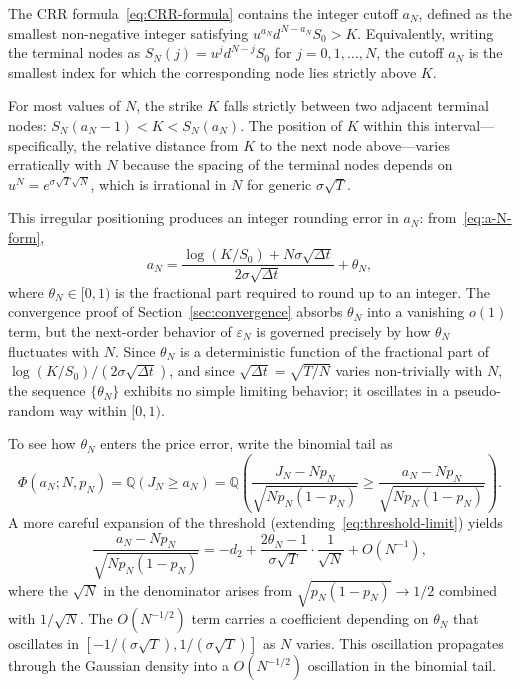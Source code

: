 \documentclass[11pt,a4paper]{article}
\theoremstyle{plain}
\theoremstyle{definition}
\newcommand{\Q}{\mathbb{Q}}
\begin{document}
The CRR formula~\eqref{eq:CRR-formula} contains the integer cutoff
$a_N$, defined as the smallest non-negative integer satisfying
$u^{a_N} d^{N - a_N} S_0 > K$. Equivalently, writing the terminal nodes
as $S_N(j) = u^j d^{N-j} S_0$ for $j = 0, 1, \dots, N$, the cutoff $a_N$
is the smallest index for which the corresponding node lies strictly
above $K$.

For most values of $N$, the strike $K$ falls strictly between two
adjacent terminal nodes: $S_N(a_N - 1) < K < S_N(a_N)$. The position of
$K$ within this interval---specifically, the relative distance from
$K$ to the next node above---varies erratically with $N$ because the
spacing of the terminal nodes depends on $u^N = e^{\sigma \sqrt{T}\sqrt{N}}$,
which is irrational in $N$ for generic $\sigma\sqrt{T}$.

This irregular positioning produces an integer rounding error in
$a_N$: from~\eqref{eq:a-N-form},
\[
a_N = \frac{\log(K/S_0) + N \sigma \sqrt{\Delta t}}{2 \sigma \sqrt{\Delta t}}
      + \theta_N,
\]
where $\theta_N \in [0, 1)$ is the fractional part required to round up
to an integer. The convergence proof of Section~\ref{sec:convergence}
absorbs $\theta_N$ into a vanishing $o(1)$ term, but the next-order
behavior of $\varepsilon_N$ is governed precisely by how $\theta_N$
fluctuates with $N$. Since $\theta_N$ is a deterministic function of the
fractional part of $\log(K/S_0)/(2\sigma\sqrt{\Delta t})$, and since
$\sqrt{\Delta t} = \sqrt{T/N}$ varies non-trivially with $N$, the
sequence $\{\theta_N\}$ exhibits no simple limiting behavior; it
oscillates in a pseudo-random way within $[0, 1)$.

To see how $\theta_N$ enters the price error, write the binomial tail as
\begin{equation}
    \label{eq:tail-with-theta}
    \Phi(a_N; N, p_N) = \Q(J_N \geq a_N)
    = \Q\!\left( \frac{J_N - N p_N}{\sqrt{N p_N(1-p_N)}}
                \geq \frac{a_N - N p_N}{\sqrt{N p_N(1-p_N)}} \right).
\end{equation}
A more careful expansion of the threshold (extending~\eqref{eq:threshold-limit})
yields
\begin{equation}
    \label{eq:threshold-expansion}
    \frac{a_N - N p_N}{\sqrt{N p_N(1-p_N)}}
    = -d_2 + \frac{2 \theta_N - 1}{\sigma\sqrt{T}}\cdot\frac{1}{\sqrt{N}}
      + O(N^{-1}),
\end{equation}
where the $\sqrt{N}$ in the denominator arises from
$\sqrt{p_N(1-p_N)} \to 1/2$ combined with $1/\sqrt{N}$. The
$O(N^{-1/2})$ term carries a coefficient depending on $\theta_N$ that
oscillates in $[-1/(\sigma\sqrt{T}), 1/(\sigma\sqrt{T})]$ as $N$ varies.
This oscillation propagates through the Gaussian density into a
$O(N^{-1/2})$ oscillation in the binomial tail.
\end{document}
